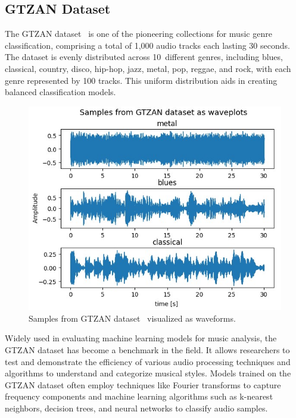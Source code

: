 
\subsection{GTZAN Dataset}
\label{ssec:gtzanDataset}

The GTZAN dataset~\cite{GTZAN} is one of the pioneering collections for music genre classification, comprising a total of 1,000 audio tracks each lasting 30 seconds. The dataset is evenly distributed across 10~different genres, including blues, classical, country, disco, hip-hop, jazz, metal, pop, reggae, and rock, with each genre represented by 100 tracks. This uniform distribution aids in creating balanced classification models.

\begin{figure}[!htb]
    \centering
    \includegraphics[scale=0.6]{Images/gtzan-example.jpg}
    \caption{Samples from GTZAN dataset~\cite{GTZAN} visualized as waveforms.}
    \label{fig:gtzanExample}
\end{figure}

Widely used in evaluating machine learning models for music analysis, the GTZAN dataset has become a benchmark in the field. It allows researchers to test and demonstrate the efficiency of various audio processing techniques and algorithms to understand and categorize musical styles. Models trained on the GTZAN dataset often employ techniques like Fourier transforms to capture frequency components and machine learning algorithms such as k-nearest neighbors, decision trees, and neural networks to classify audio samples.

